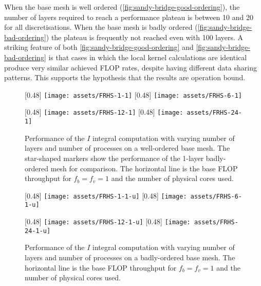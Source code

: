 \documentclass[11pt, a4paper]{scrartcl}
\begin{document}
When the base mesh is well ordered
(\autoref{fig:sandy-bridge-good-ordering}), the number of layers
required to reach a performance plateau is between 10 and 20 for all
discretisations. When the base mesh is badly ordered
(\autoref{fig:sandy-bridge-bad-ordering}) the plateau is frequently
not reached even with 100 layers.  A striking feature of both
\autoref{fig:sandy-bridge-good-ordering} and
\autoref{fig:sandy-bridge-bad-ordering} is that cases in which the
local kernel calculations are identical produce very similar achieved
FLOP rates, despite having different data sharing patterns.  This
supports the hypothesis that the results are operation bound.

\begin{figure}[p]
\centering
  [0.48\linewidth]
  {\texttt{[image: assets/FRHS-1-1]}}
  [0.48\linewidth]
  {\texttt{[image: assets/FRHS-6-1]}}

  \vspace{\baselineskip}
  [0.48\linewidth]
  {\texttt{[image: assets/FRHS-12-1]}}
  [0.48\linewidth]  
  {\texttt{[image: assets/FRHS-24-1]}}
  \caption{Performance of the $I$ integral computation with varying
    number of layers and number of processes on a well-ordered base
    mesh. The star-shaped markers show the performance of the 1-layer
    badly-ordered mesh for comparison. The horizontal line is the base
    FLOP throughput for $f_b = f_v = 1$ and the number of physical
    cores used.}
  \label{fig:sandy-bridge-good-ordering}
\end{figure}

\begin{figure}[p]
  \centering
  [0.48\linewidth]
  {\texttt{[image: assets/FRHS-1-1-u]}}
  [0.48\linewidth]
  {\texttt{[image: assets/FRHS-6-1-u]}}

  \vspace{\baselineskip}
  [0.48\linewidth]
  {\texttt{[image: assets/FRHS-12-1-u]}}
  [0.48\linewidth]  
  {\texttt{[image: assets/FRHS-24-1-u]}}

  \caption{Performance of the $I$ integral computation with varying
    number of layers and number of processes on a badly-ordered base
    mesh. The horizontal line is the base FLOP throughput for
    $f_b = f_v = 1$ and the number of physical cores used.}
  \label{fig:sandy-bridge-bad-ordering}
\end{figure}
\end{document}
